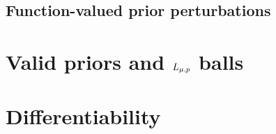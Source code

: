 \hrulefill

\subsection{Function-valued prior perturbations}


\section{Valid priors and ${L_{\mu,p}}$ balls}


\section{Differentiability}

